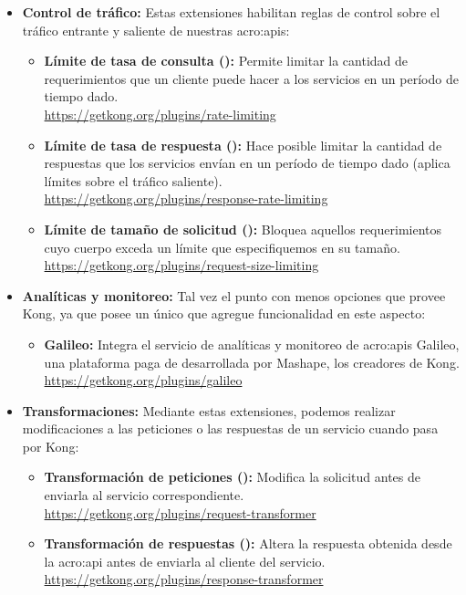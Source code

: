 \begin{itemize}
  \item \textbf{Control de tráfico:} Estas extensiones habilitan reglas de control sobre el tráfico entrante y saliente de nuestras \glspl{acro:api}:
  \begin{itemize}
    \item \textbf{Límite de tasa de consulta ():} Permite limitar la cantidad de requerimientos que un cliente puede hacer a los servicios en un período de tiempo dado. \\
    \url{https://getkong.org/plugins/rate-limiting}
    \item \textbf{Límite de tasa de respuesta ():} Hace posible limitar la cantidad de respuestas que los servicios envían en un período de tiempo dado (aplica límites sobre el tráfico saliente). \\
    \url{https://getkong.org/plugins/response-rate-limiting}
    \item \textbf{Límite de tamaño de solicitud ():} Bloquea aquellos requerimientos cuyo cuerpo exceda un límite que especifiquemos en su tamaño. \\
    \url{https://getkong.org/plugins/request-size-limiting}
  \end{itemize}

  \item \textbf{Analíticas y monitoreo:} Tal vez el punto con menos opciones que provee Kong, ya que posee un único  que agregue funcionalidad en este aspecto:
  \begin{itemize}
    \item \textbf{Galileo:} Integra el servicio de analíticas y monitoreo de \glspl{acro:api} Galileo, una plataforma paga de  desarrollada por Mashape, los creadores de Kong. \\
    \url{https://getkong.org/plugins/galileo}
  \end{itemize}

  \item \textbf{Transformaciones:} Mediante estas extensiones, podemos realizar modificaciones a las peticiones o las respuestas de un servicio cuando pasa por Kong:
  \begin{itemize}
    \item \textbf{Transformación de peticiones ():} Modifica la solicitud antes de enviarla al servicio correspondiente. \\
    \url{https://getkong.org/plugins/request-transformer}
    \item \textbf{Transformación de respuestas ():} Altera la respuesta obtenida desde la \gls{acro:api} antes de enviarla al cliente del servicio. \\
    \url{https://getkong.org/plugins/response-transformer}
  \end{itemize}


\end{itemize}
